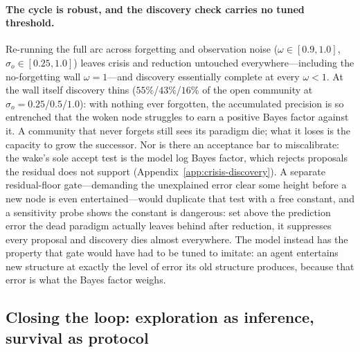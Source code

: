 \documentclass[11pt]{article}
\begin{document}
\paragraph{The cycle is robust, and the discovery check carries no tuned threshold.}
Re-running the full arc across forgetting and observation noise ($\omega\in[0.9,1.0]$,
$\sigma_o\in[0.25,1.0]$) leaves crisis and reduction untouched everywhere---including the
no-forgetting wall $\omega=1$---and discovery essentially complete at every $\omega<1$. At the wall
itself discovery thins ($55\%$/$43\%$/$16\%$ of the open community at
$\sigma_o=0.25$/$0.5$/$1.0$): with nothing ever forgotten, the accumulated precision is so
entrenched that the woken node struggles to earn a positive Bayes factor against it. A community
that never forgets still sees its paradigm die; what it loses is the capacity to grow the
successor. Nor is there an acceptance bar to miscalibrate: the wake's sole
accept test is the model log Bayes factor, which rejects proposals the residual does not support
(Appendix~\ref{app:crisis-discovery}). A separate residual-floor gate---demanding the unexplained
error clear some height before a new node is even entertained---would duplicate that test with a
free constant, and a sensitivity probe shows the constant is dangerous: set above the prediction
error the dead paradigm actually leaves behind after reduction, it suppresses every proposal and
discovery dies almost everywhere. The model instead has the property that gate would have had to be
tuned to imitate: an agent entertains new structure at exactly the level of error its old structure
produces, because that error is what the Bayes factor weighs.

\subsection{Closing the loop: exploration as inference, survival as protocol}
\label{sec:res-closing}
\end{document}
